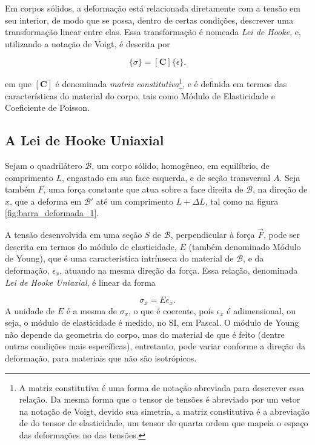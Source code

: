 Em corpos sólidos, a deformação está relacionada diretamente com a tensão em seu interior, de modo que se possa, dentro de certas condições, descrever uma transformação linear entre elas. Essa transformação é nomeada \emph{Lei de Hooke}, e, utilizando a notação de Voigt, é descrita por

\begin{equation}
    \{\sigma\} = [\bm{C}] \{\epsilon\}.
    \label{eq:lei_de_hooke}
\end{equation}

em que $[\bm{C}]$ é denominada \emph{matriz constitutiva}\footnote{A matriz constitutiva é uma forma de notação abreviada para descrever essa relação. Da mesma forma que o tensor de tensões é abreviado por um vetor na notação de Voigt, devido sua simetria, a matriz constitutiva é a abreviação de do tensor de elasticidade, um tensor de quarta ordem que mapeia o espaço das deformações no das tensões.}, e é definida em termos das características do material do corpo, tais como Módulo de Elasticidade e Coeficiente de Poisson.

\subsection{A Lei de Hooke Uniaxial}

Sejam o quadrilátero $\mathcal{B}$, um corpo sólido, homogêneo, em equilíbrio, de comprimento $L$, engastado em sua face esquerda, e de seção transversal $A$. Seja também $F$, uma força constante que atua sobre a face direita de $\mathcal{B}$, na direção de $x$, que a deforma em $\mathcal{B}'$ até um comprimento $L+\Delta L$, tal como na figura \ref{fig:barra_deformada_1}. 



A tensão desenvolvida em uma seção $S$ de $\mathcal{B}$, perpendicular à força $\vec{F}$, pode ser descrita em termos do módulo de elasticidade, $E$ (também denominado Módulo de Young), que é uma característica intrínseca do material de $\mathcal{B}$, e da deformação, $\epsilon_x$, atuando na mesma direção da força. Essa relação, denominada \emph{Lei de Hooke Uniaxial}, é linear da forma

\begin{equation}
    \sigma_x = E \epsilon_x.
    \label{eq:lei_de_hooke_uniaxial}
\end{equation} 
A unidade de $E$ é a mesma de $\sigma_x$, o que é coerente, pois $\epsilon_x$ é adimensional, ou seja, o módulo de elasticidade é medido, no SI, em Pascal. O módulo de Young não depende da geometria do corpo, mas do material de que é feito (dentre outras condições mais específicas), entretanto, pode variar conforme a direção da deformação, para materiais que não são isotrópicos.

